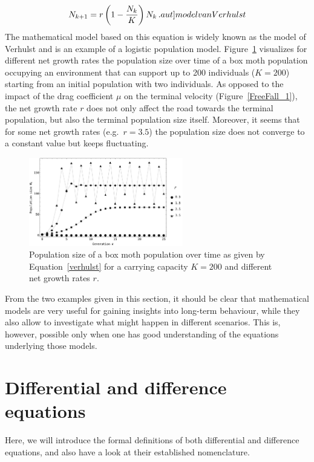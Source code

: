 \begin{equation}
	N_{k+1}=r\left(1-\dfrac{N_k}{K}\right)N_k\,.
	\label{verhulst}
	\index{Verhulst model}
    \index[aut]{model van Verhulst}
\end{equation}
The mathematical model based on this equation is widely known as the model of Verhulst and is an example of a logistic population model. Figure~\ref{VerhulstFig} visualizes for different net growth rates the population size over time of a box moth population occupying an environment that can support up to 200 individuals ($K=200$) starting from an initial population with two individuals. As opposed to the impact of the drag coefficient $\mu$ on the terminal velocity (Figure~\ref{FreeFall_1}), the net growth rate $r$ does not only affect the road towards the terminal population, but also the terminal population size itself. Moreover, it seems that for some net growth rates (e.g.\ $r=3.5$) the population size does not converge to a constant value but keeps fluctuating. 

\begin{figure}
	\begin{center}
			\includegraphics[width=0.6\textwidth]{Verhulst.pdf}
	\caption{Population size of a box moth population over time as given by Equation~\eqref{verhulst} for a carrying capacity $K=200$ and different net growth rates $r$.}
	\label{VerhulstFig}
	\end{center}
\end{figure}

From the two examples given in this section, it should be clear that mathematical models are very useful for gaining insights into  long-term behaviour, while they also allow to investigate what might happen in different scenarios. This is, however, possible only when one has good understanding of the equations underlying those models. 

\section{Differential and difference equations}
Here, we will introduce the formal definitions of both differential and difference equations, and also have a look at their established nomenclature. 

